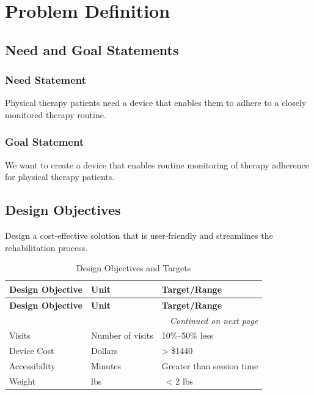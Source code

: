\documentclass{article}
\begin{document}
\section{Problem Definition}

\subsection{Need and Goal Statements}
\subsubsection{Need Statement}
Physical therapy patients need a device that enables them to adhere to a closely monitored therapy routine.
\subsubsection{Goal Statement}
We want to create a device that enables routine monitoring of therapy adherence for physical therapy patients.

\subsection{Design Objectives}
Design a cost-effective solution that is user-friendly and streamlines the rehabilitation process.
\begin{longtable}{|l|l|l|}
    \caption{Design Objectives and Targets} \label{tab:design_objectives} \\
    \hline
    \textbf{Design Objective} & \textbf{Unit} & \textbf{Target/Range} \\ \hline
    \endfirsthead

    \hline
    \textbf{Design Objective} & \textbf{Unit} & \textbf{Target/Range} \\ \hline
    \endhead

    \hline
    \multicolumn{3}{|r|}{\textit{Continued on next page}} \\ \hline
    \endfoot

    \hline
    \endlastfoot

    Visits & Number of visits & 10\%--50\% less \\ \hline
    Device Cost & Dollars & \textgreater{} \$1440 \\ \hline
    Accessibility & Minutes & Greater than session time \\ \hline
    Weight & lbs & \ \textless{} 2 lbs \\ \hline
\end{longtable}
\end{document}
